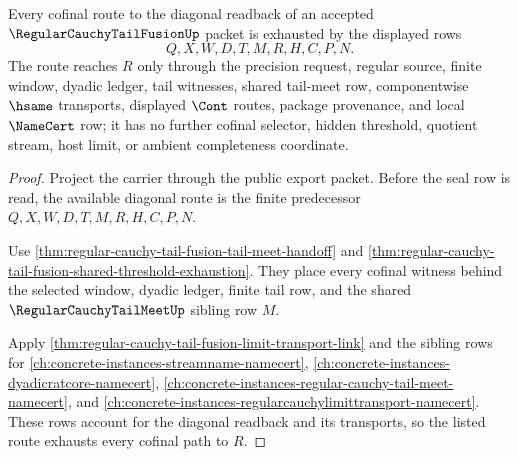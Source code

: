 \begin{theorem}
\label{thm:regular-cauchy-tail-fusion-cofinal-route-totality}
Every cofinal route to the diagonal readback of an accepted $\RegularCauchyTailFusionUp$ packet is exhausted by the displayed rows
$$
Q,X,W,D,T,M,R,H,C,P,N.
$$
The route reaches $R$ only through the precision request, regular source, finite window, dyadic ledger, tail witnesses, shared tail-meet row, componentwise $\hsame$ transports, displayed $\Cont$ routes, package provenance, and local $\NameCert$ row; it has no further cofinal selector, hidden threshold, quotient stream, host limit, or ambient completeness coordinate.
\end{theorem}
\begin{proof}
Project the carrier through the public export packet. Before the seal row is read, the available diagonal route is the finite predecessor $Q,X,W,D,T,M,R,H,C,P,N$.

Use \autoref{thm:regular-cauchy-tail-fusion-tail-meet-handoff} and \autoref{thm:regular-cauchy-tail-fusion-shared-threshold-exhaustion}. They place every cofinal witness behind the selected window, dyadic ledger, finite tail row, and the shared $\RegularCauchyTailMeetUp$ sibling row $M$.

Apply \autoref{thm:regular-cauchy-tail-fusion-limit-transport-link} and the sibling rows for \autoref{ch:concrete-instances-streamname-namecert}, \autoref{ch:concrete-instances-dyadicratcore-namecert}, \autoref{ch:concrete-instances-regular-cauchy-tail-meet-namecert}, and \autoref{ch:concrete-instances-regularcauchylimittransport-namecert}. These rows account for the diagonal readback and its transports, so the listed route exhausts every cofinal path to $R$.
\end{proof}

